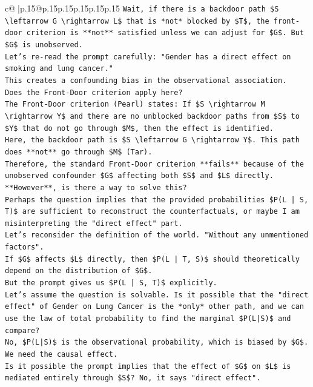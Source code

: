 \documentclass{article}
\begin{document}
{\begin{supertabular}{c@{$\;$}|p{.15\linewidth}@{}p{.15\linewidth}p{.15\linewidth}p{.15\linewidth}p{.15\linewidth}p{.15\linewidth}}
{{{\texttt{Wait, if there is a backdoor path \$S \textbackslash{}leftarrow G \textbackslash{}rightarrow L\$ that is *not* blocked by \$T\$, the front{-}door criterion is **not** satisfied unless we can adjust for \$G\$. But \$G\$ is unobserved.} \\
\texttt{Let's re{-}read the prompt carefully: "Gender has a direct effect on smoking and lung cancer."} \\
\texttt{This creates a confounding bias in the observational association.} \\
\texttt{Does the Front{-}Door criterion apply here?} \\
\texttt{The Front{-}Door criterion (Pearl) states: If \$S \textbackslash{}rightarrow M \textbackslash{}rightarrow Y\$ and there are no unblocked backdoor paths from \$S\$ to \$Y\$ that do not go through \$M\$, then the effect is identified.} \\
\texttt{Here, the backdoor path is \$S \textbackslash{}leftarrow G \textbackslash{}rightarrow Y\$. This path does **not** go through \$M\$ (Tar).} \\
\texttt{Therefore, the standard Front{-}Door criterion **fails** because of the unobserved confounder \$G\$ affecting both \$S\$ and \$L\$ directly.} \\
\texttt{**However**, is there a way to solve this?} \\
\texttt{Perhaps the question implies that the provided probabilities \$P(L | S, T)\$ are sufficient to reconstruct the counterfactuals, or maybe I am misinterpreting the "direct effect" part.} \\
\texttt{Let's reconsider the definition of the world. "Without any unmentioned factors".} \\
\texttt{If \$G\$ affects \$L\$ directly, then \$P(L | T, S)\$ should theoretically depend on the distribution of \$G\$.} \\
\texttt{But the prompt gives us \$P(L | S, T)\$ explicitly.} \\
\texttt{Let's assume the question is solvable. Is it possible that the "direct effect" of Gender on Lung Cancer is the *only* other path, and we can use the law of total probability to find the marginal \$P(L|S)\$ and compare?} \\
\texttt{No, \$P(L|S)\$ is the observational probability, which is biased by \$G\$. We need the causal effect.} \\
\texttt{Is it possible the prompt implies that the effect of \$G\$ on \$L\$ is mediated entirely through \$S\$? No, it says "direct effect".} \\
}}}
\end{supertabular}}
\end{document}
